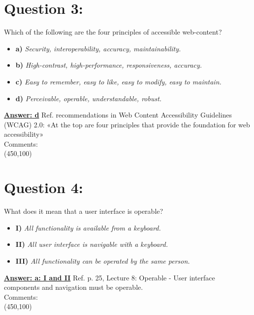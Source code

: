 \documentclass[12pt,a4paper,norsk]{article}
\begin{document}
\section {Question 3:} Which of the following are the four principles of accessible web-content?  \\

\begin{itemize}
 \item \textbf{a)} \textit{Security, interoperability, accuracy, maintainability.}
 \item \textbf{b)} \textit{High-contrast, high-performance, responsiveness, accuracy.}
 \item \textbf{c)} \textit{Easy to remember, easy to like, easy to modify, easy to maintain.}
 \item \textbf{d)} \textit{Perceivable, operable, understandable, robust.}
\end{itemize}

\underline{\textbf{Answer: d}} Ref. recommendations in Web Content Accessibility Guidelines (WCAG) 2.0: «At the top are four principles that provide the foundation for web accessibility» \\

\noindent Comments:\\
\framebox(450,100){}\\

\section {Question 4:} What does it mean that a user interface is operable?\\

\begin{itemize}
 \item \textbf{I)} \textit{All functionality is available from a keyboard.}
 \item \textbf{II)} \textit{All user interface is navigable with a keyboard.}
 \item \textbf{III)} \textit{All functionality can be operated by the same person.}
\end{itemize}

\underline{\textbf{Answer: a: I and II}} Ref. p. 25, Lecture 8: Operable - User interface components and navigation must be operable.\\

\noindent Comments:\\
\framebox(450,100){}\\
\end{document}
